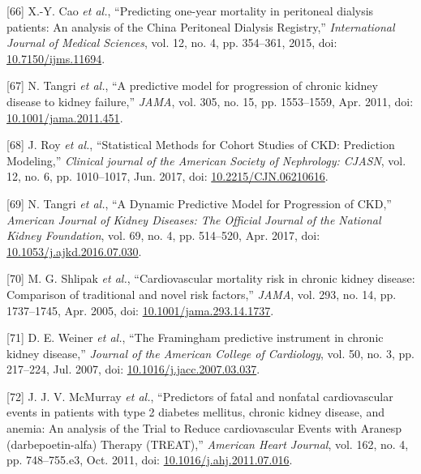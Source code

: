 \documentclass[12pt,PhD,twoside,openright]{muthesis}
\newenvironment{cslreferences}%
  {}%
  {\par}
\begin{document}
\begin{cslreferences}
\leavevmode\hypertarget{ref-cao_predicting_2015}{}%
{[}66{]} X.-Y. Cao \emph{et al.}, ``Predicting one-year mortality in peritoneal dialysis patients: An analysis of the China Peritoneal Dialysis Registry,'' \emph{International Journal of Medical Sciences}, vol. 12, no. 4, pp. 354--361, 2015, doi: \href{https://doi.org/10.7150/ijms.11694}{10.7150/ijms.11694}.

\leavevmode\hypertarget{ref-tangri_predictive_2011}{}%
{[}67{]} N. Tangri \emph{et al.}, ``A predictive model for progression of chronic kidney disease to kidney failure,'' \emph{JAMA}, vol. 305, no. 15, pp. 1553--1559, Apr. 2011, doi: \href{https://doi.org/10.1001/jama.2011.451}{10.1001/jama.2011.451}.

\leavevmode\hypertarget{ref-roy_statistical_2017}{}%
{[}68{]} J. Roy \emph{et al.}, ``Statistical Methods for Cohort Studies of CKD: Prediction Modeling,'' \emph{Clinical journal of the American Society of Nephrology: CJASN}, vol. 12, no. 6, pp. 1010--1017, Jun. 2017, doi: \href{https://doi.org/10.2215/CJN.06210616}{10.2215/CJN.06210616}.

\leavevmode\hypertarget{ref-tangri_dynamic_2017}{}%
{[}69{]} N. Tangri \emph{et al.}, ``A Dynamic Predictive Model for Progression of CKD,'' \emph{American Journal of Kidney Diseases: The Official Journal of the National Kidney Foundation}, vol. 69, no. 4, pp. 514--520, Apr. 2017, doi: \href{https://doi.org/10.1053/j.ajkd.2016.07.030}{10.1053/j.ajkd.2016.07.030}.

\leavevmode\hypertarget{ref-shlipak_cardiovascular_2005}{}%
{[}70{]} M. G. Shlipak \emph{et al.}, ``Cardiovascular mortality risk in chronic kidney disease: Comparison of traditional and novel risk factors,'' \emph{JAMA}, vol. 293, no. 14, pp. 1737--1745, Apr. 2005, doi: \href{https://doi.org/10.1001/jama.293.14.1737}{10.1001/jama.293.14.1737}.

\leavevmode\hypertarget{ref-weiner_framingham_2007}{}%
{[}71{]} D. E. Weiner \emph{et al.}, ``The Framingham predictive instrument in chronic kidney disease,'' \emph{Journal of the American College of Cardiology}, vol. 50, no. 3, pp. 217--224, Jul. 2007, doi: \href{https://doi.org/10.1016/j.jacc.2007.03.037}{10.1016/j.jacc.2007.03.037}.

\leavevmode\hypertarget{ref-mcmurray_predictors_2011}{}%
{[}72{]} J. J. V. McMurray \emph{et al.}, ``Predictors of fatal and nonfatal cardiovascular events in patients with type 2 diabetes mellitus, chronic kidney disease, and anemia: An analysis of the Trial to Reduce cardiovascular Events with Aranesp (darbepoetin-alfa) Therapy (TREAT),'' \emph{American Heart Journal}, vol. 162, no. 4, pp. 748--755.e3, Oct. 2011, doi: \href{https://doi.org/10.1016/j.ahj.2011.07.016}{10.1016/j.ahj.2011.07.016}.


\end{cslreferences}
\end{document}

